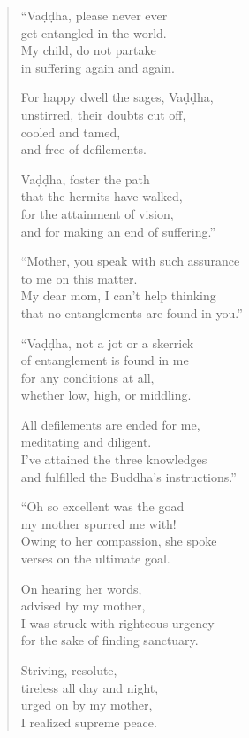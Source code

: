 \documentclass[12pt,openany]{book}%
\begin{document}
\begin{verse}%
“\textsanskrit{Vaḍḍha}, please never ever \\
get entangled in the world. \\
My child, do not partake \\
in suffering again and again. 

For happy dwell the sages, \textsanskrit{Vaḍḍha}, \\
unstirred, their doubts cut off, \\
cooled and tamed, \\
and free of defilements. 

\textsanskrit{Vaḍḍha}, foster the path \\
that the hermits have walked, \\
for the attainment of vision, \\
and for making an end of suffering.” 

“Mother, you speak with such assurance \\
to me on this matter. \\
My dear mom, I can’t help thinking \\
that no entanglements are found in you.” 

“\textsanskrit{Vaḍḍha}, not a jot or a skerrick \\
of entanglement is found in me \\
for any conditions at all, \\
whether low, high, or middling. 

All defilements are ended for me, \\
meditating and diligent. \\
I’ve attained the three knowledges \\
and fulfilled the Buddha’s instructions.” 

“Oh so excellent was the goad \\
my mother spurred me with! \\
Owing to her compassion, she spoke \\
verses on the ultimate goal. 

On hearing her words, \\
advised by my mother, \\
I was struck with righteous urgency \\
for the sake of finding sanctuary. 

Striving, resolute, \\
tireless all day and night, \\
urged on by my mother, \\
I realized supreme peace. 

%
\end{verse}
\end{document}
